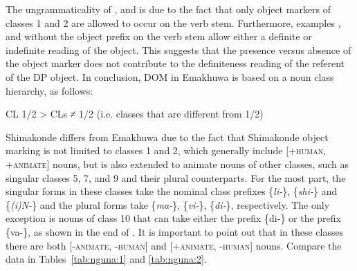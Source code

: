 \documentclass[output=paper]{langsci/langscibook}
\begin{document}
The ungrammaticality of ,  and  is due to the fact that only object markers of classes 1 and 2 are allowed to occur on the verb stem. Furthermore, examples ,  and  without the object prefix on the verb stem allow either a definite or indefinite reading of the object. This suggests that the presence versus absence of the object marker does not contribute to the definiteness reading of the referent of the DP object. In conclusion, DOM in Emakhuwa is based on a noun class hierarchy, as follows:

\ea\label{ex:nguna:}
 CL 1/2 > CLs ≠ 1/2 (i.e. classes that are different from 1/2)
\z

{Shimakonde differs from Emakhuwa due to the fact that Shimakonde object marking is not limited to classes 1 and 2, which generally include [+}{\textsc{human}}{, +}{\textsc{animate}}{] nouns, but is also extended to animate nouns of other classes, such as singular classes 5, 7, and 9 and their plural counterparts.} {For the most part, }{the singular forms in these classes take the nominal class prefixes \{}{\textit{li-}}{\}, \{}{\textit{shi-}}{\} and \{}{\textit{(i)N-}}{\} and the plural forms take \{}{\textit{ma-}}{\}, \{}{\textit{vi-}}{\}, \{}{\textit{di-}}{\}, respectively. The only exception is nouns of class 10 that can take either the prefix \{di-\} or the prefix \{va-\}, as shown in the end of . }{It is important to point out that} {in these classes there are both [-}{\textsc{animate, -human}}{] and [+}{\textsc{animate, -human}}{] nouns. Compare the data in Tables~\ref{tab:nguna:1} and \ref{tab:nguna:2}.}
\end{document}
